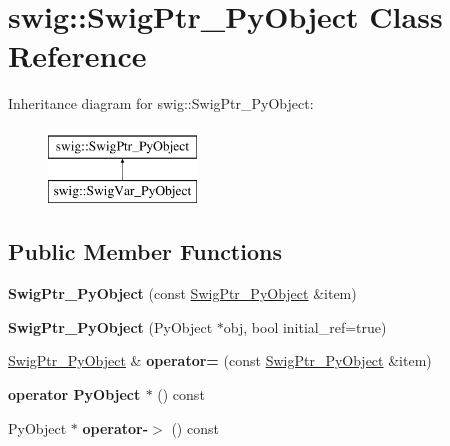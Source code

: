 \hypertarget{classswig_1_1_swig_ptr___py_object}{\section{swig\-:\-:Swig\-Ptr\-\_\-\-Py\-Object Class Reference}
\label{classswig_1_1_swig_ptr___py_object}
}
Inheritance diagram for swig\-:\-:Swig\-Ptr\-\_\-\-Py\-Object\-:\begin{figure}[H]
\begin{center}
\leavevmode
\includegraphics[height=2.000000cm]{classswig_1_1_swig_ptr___py_object}
\end{center}
\end{figure}
\subsection*{Public Member Functions}
\begin{DoxyCompactItemize}
\item 
\hypertarget{classswig_1_1_swig_ptr___py_object_a4282f20207f8cd22c9b079203c832a04}{{\bfseries Swig\-Ptr\-\_\-\-Py\-Object} (const \hyperlink{classswig_1_1_swig_ptr___py_object}{Swig\-Ptr\-\_\-\-Py\-Object} \&item)}\label{classswig_1_1_swig_ptr___py_object_a4282f20207f8cd22c9b079203c832a04}

\item 
\hypertarget{classswig_1_1_swig_ptr___py_object_a4503d58d577d209f5e1fa67026852505}{{\bfseries Swig\-Ptr\-\_\-\-Py\-Object} (Py\-Object $\ast$obj, bool initial\-\_\-ref=true)}\label{classswig_1_1_swig_ptr___py_object_a4503d58d577d209f5e1fa67026852505}

\item 
\hypertarget{classswig_1_1_swig_ptr___py_object_a86d8657d6b4a27c8e9e6942bc1ba572c}{\hyperlink{classswig_1_1_swig_ptr___py_object}{Swig\-Ptr\-\_\-\-Py\-Object} \& {\bfseries operator=} (const \hyperlink{classswig_1_1_swig_ptr___py_object}{Swig\-Ptr\-\_\-\-Py\-Object} \&item)}\label{classswig_1_1_swig_ptr___py_object_a86d8657d6b4a27c8e9e6942bc1ba572c}

\item 
\hypertarget{classswig_1_1_swig_ptr___py_object_aa2f1cdba0651c7a52482d225faef0574}{{\bfseries operator Py\-Object $\ast$} () const }\label{classswig_1_1_swig_ptr___py_object_aa2f1cdba0651c7a52482d225faef0574}

\item 
\hypertarget{classswig_1_1_swig_ptr___py_object_a97a20cad6a2b0916f39c45555fb559f0}{Py\-Object $\ast$ {\bfseries operator-\/$>$} () const }\label{classswig_1_1_swig_ptr___py_object_a97a20cad6a2b0916f39c45555fb559f0}

\end{DoxyCompactItemize}
